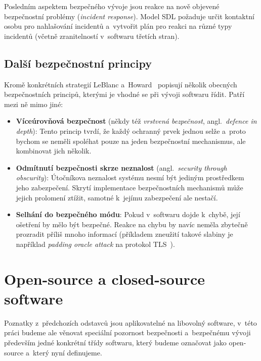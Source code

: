 Posledním aspektem bezpečného vývoje jsou reakce na nově objevené bezpečnostní problémy (\textit{incident response}). Model SDL požaduje určit kontaktní osobu pro nahlašování incidentů a~vytvořit plán pro reakci na různé typy incidentů (včetně zranitelností v~softwaru třetích stran).

\subsection{Další bezpečnostní principy}

Kromě konkrétních strategií LeBlanc a~Howard~\cite{leblanc2002writing} popisují několik obecných bezpečnostních principů, kterými je vhodné se při vývoji softwaru řídit. Patří mezi ně mimo jiné:

\begin{itemize}
    \item \textbf{Víceúrovňová bezpečnost} (někdy též \emph{vrstvená bezpečnost}, angl.\ \textit{defence in depth}): Tento princip tvrdí, že každý ochranný prvek jednou selže a~proto bychom se neměli spoléhat pouze na jeden bezpečnostní mechanismus, ale kombinovat jich několik.

    \item \textbf{Odmítnutí bezpečnosti skrze neznalost} (angl.\ \textit{security through obscurity}): Útočníkova neznalost systému nesmí být jediným prostředkem jeho zabezpečení. Skrytí implementace bezpečnostních mechanismů může jejich prolomení ztížit, samotné k~jejímu zabezpečení ale nestačí.

    \item \textbf{Selhání do bezpečného módu}: Pokud v~softwaru dojde k~chybě, její ošetření by mělo být bezpečné. Reakce na chybu by navíc neměla zbytečně prozradit příliš mnoho informací (příkladem zneužití takové slabiny je například \textit{padding oracle attack} na protokol TLS~\cite{cloudflarepaddingoracle}).
\end{itemize}

\section{Open-source a closed-source software}

Poznatky z~předchozích odstavců jsou aplikovatelné na libovolný software, v~této práci budeme ale věnovat speciální pozornost bezpečnosti a~bezpečnému vývoji především jedné konkrétní třídy softwaru, který budeme označovat jako open-source a~který nyní definujeme.

